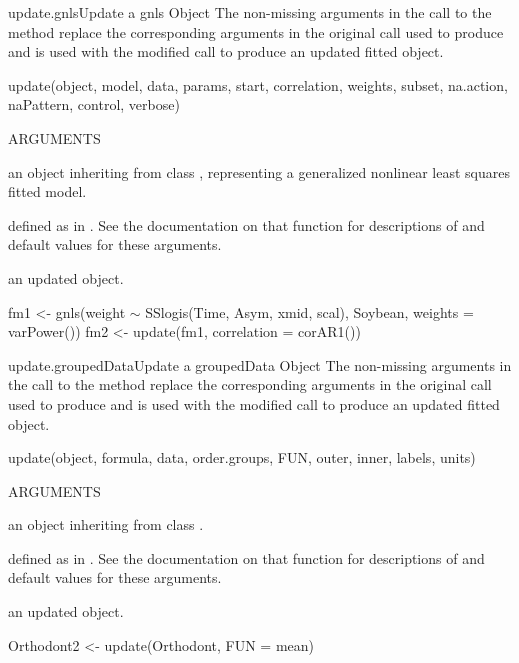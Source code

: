 \documentclass[pdftex]{article} \usepackage{url,graphicx}
\renewcommand{\Twiddle}{\mbox{\(\sim\)}}
\begin{document}
\begin{Helpfile}{update.gnls}{Update a gnls Object}
The non-missing arguments in the call to the  method
replace the corresponding arguments in the original call used to
produce  and  is used with the modified call to
produce an updated fitted object.
\begin{Example}
update(object, model, data, params, start, correlation, weights, 
       subset, na.action, naPattern, control, verbose) 
\end{Example}
\begin{Argument}{ARGUMENTS}
\item[\Co{object:}]
an object inheriting from class , representing
a generalized nonlinear least squares fitted model.
\item[\Co{other arguments:}]
defined as in . See the
documentation on that function for descriptions of and default values
for these arguments.
\end{Argument}
an updated  object.
\need 15pt
\vspace{-16pt}
\begin{Example}
fm1 <- gnls(weight {\Twiddle} SSlogis(Time, Asym, xmid, scal), Soybean,
            weights = varPower())
fm2 <- update(fm1, correlation = corAR1())
\end{Example}
\end{Helpfile}
\begin{Helpfile}{update.groupedData}{Update a groupedData Object}
The non-missing arguments in the call to the 
method replace the corresponding arguments in the original call used to
produce  and  is used with the modified
call to produce an updated fitted object.
\begin{Example}
update(object, formula, data, order.groups, FUN, outer, inner, 
       labels, units)
\end{Example}
\begin{Argument}{ARGUMENTS}
\item[\Co{object:}]
an object inheriting from class .
\item[\Co{other arguments:}]
defined as in . See the
documentation on that function for descriptions of and default values
for these arguments.
\end{Argument}
an updated  object.
\need 15pt
\vspace{-16pt} 
\begin{Example}
Orthodont2 <- update(Orthodont, FUN = mean)
\end{Example}
\end{Helpfile}
\end{document}
